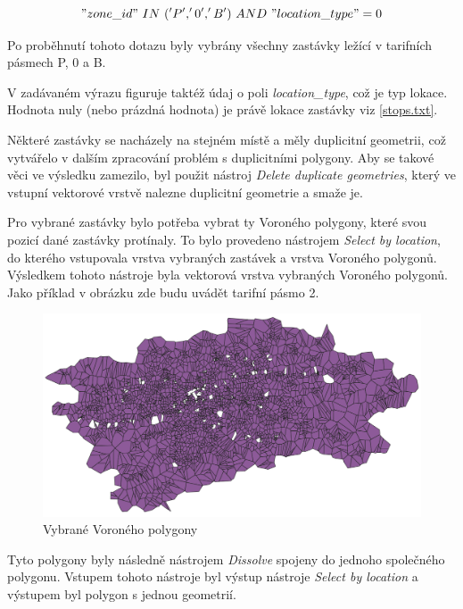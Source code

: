 \["zone\_id"\ IN\ ('P','0','B')\ AND\ "location\_type" = 0\]

Po proběhnutí tohoto dotazu byly vybrány všechny zastávky ležící v tarifních pásmech P, 0 a B. 

V zadávaném výrazu figuruje taktéž údaj o poli \textit{location\_type}, což je typ lokace. 
Hodnota nuly (nebo prázdná hodnota) je právě lokace zastávky viz \ref{stops.txt}.

Některé zastávky se nacházely na stejném místě a měly duplicitní geometrii, což vytvářelo v dalším
zpracování problém s duplicitními polygony. Aby se takové věci ve výsledku zamezilo, byl použit nástroj   
\textit{Delete duplicate geometries}, který ve vstupní vektorové vrstvě nalezne duplicitní geometrie a smaže je.

Pro vybrané zastávky bylo potřeba vybrat ty Voroného polygony, které svou
pozicí dané zastávky protínaly. To bylo provedeno nástrojem \textit{Select by location},
do kterého vstupovala vrstva vybraných zastávek a vrstva Voroného polygonů. Výsledkem tohoto nástroje byla
vektorová vrstva vybraných Voroného polygonů. Jako příklad v obrázku zde budu uvádět tarifní pásmo 2.

\begin{figure}[H] \centering
    \includegraphics[width=400pt]{./pictures/voronoi-selected-P0B.png}
    \caption[Vybrané Voroného polygony]{Vybrané Voroného polygony}
	\label{fig:voronoi-selected}              
\end{figure}

Tyto polygony byly následně nástrojem \textit{Dissolve} spojeny do jednoho společného polygonu.
Vstupem tohoto nástroje byl výstup nástroje \textit{Select by location} a výstupem byl polygon
s jednou geometrií. 


